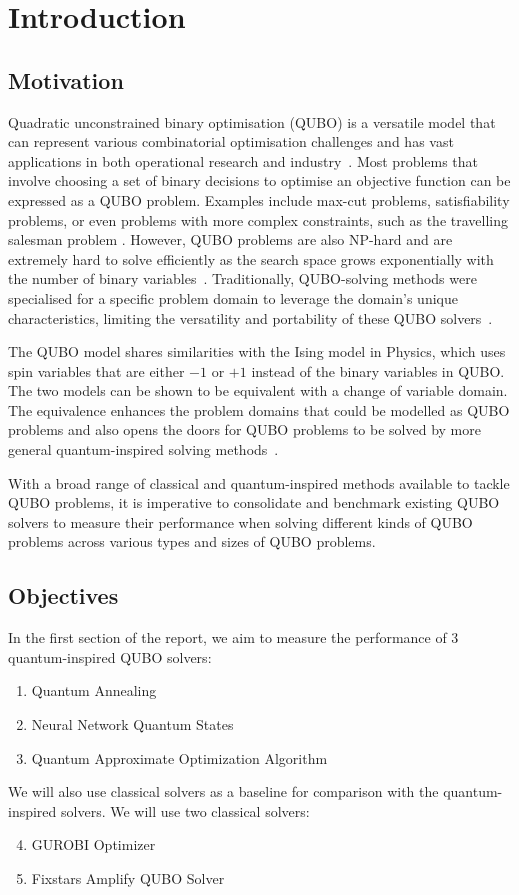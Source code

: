 
\chapter{Introduction}
\vspace{2em}

\section{Motivation}
Quadratic unconstrained binary optimisation (QUBO) is a versatile model that can represent various combinatorial optimisation challenges and has vast applications in both operational research and industry~. Most problems that involve choosing a set of binary decisions to optimise an objective function can be expressed as a QUBO problem. Examples include max-cut problems, satisfiability problems, or even problems with more complex constraints, such as the travelling salesman problem \cite{b10}. However, QUBO problems are also NP-hard and are extremely hard to solve efficiently as the search space grows exponentially with the number of binary variables~\cite{b1}. Traditionally, QUBO-solving methods were specialised for a specific problem domain to leverage the domain's unique characteristics, limiting the versatility and portability of these QUBO solvers~\cite{b5}.

The QUBO model shares similarities with the Ising model in Physics, which uses spin variables that are either $-1$ or $+1$ instead of the binary variables in QUBO. The two models can be shown to be equivalent with a change of variable domain. The equivalence enhances the problem domains that could be modelled as QUBO problems and also opens the doors for QUBO problems to be solved by more general quantum-inspired solving methods~\cite{b5}.

With a broad range of classical and quantum-inspired methods available to tackle QUBO problems, it is imperative to consolidate and benchmark existing QUBO solvers to measure their performance when solving different kinds of QUBO problems across various types and sizes of QUBO problems.

\section{Objectives}
In the first section of the report, we aim to measure the performance of 3 quantum-inspired QUBO solvers:
\begin{enumerate}
    \item Quantum Annealing
    \item Neural Network Quantum States
    \item Quantum Approximate Optimization Algorithm
\end{enumerate}
We will also use classical solvers as a baseline for comparison with the quantum-inspired solvers. We will use two classical solvers:
\begin{enumerate}
    \setcounter{enumi}{3}
    \item GUROBI Optimizer
    \item Fixstars Amplify QUBO Solver
\end{enumerate}

